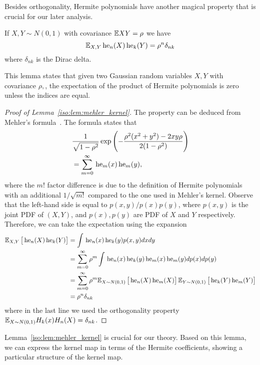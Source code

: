 
Besides orthogonality, Hermite polynomials have another magical property that is crucial for our later analysis. 

\begin{lemma}\label{iso:lem:mehler_kernel}
If $X,Y \sim N(0,1)$ with covariance $\mathbb{E} XY = \rho$ we have 
$$\mathbb{E}_{X,Y} \,\mathrm{he}_n(X)\,\mathrm{he}_k(Y) = \rho^n \delta_{nk}$$
where $\delta_{nk}$ is the Dirac delta.  
\end{lemma}

This lemma states that given two Gaussian random variables $X, Y$ with covariance $\rho,$, the expectation of the product of Hermite polynomials is zero unless the indices are equal. 

\begin{proof}[Proof of Lemma~\ref{iso:lem:mehler_kernel}]
The property can be deduced from Mehler's formula~\cite{mehler1866ueber}. The formula states that 
\begin{align*}
&\frac{1}{\sqrt{1-\rho^2}}\exp\left(-\frac{\rho^2(x^2+y^2)-2xy\rho}{2(1-\rho^2)}\right) \\
&= \sum_{m=0}^\infty \,\mathrm{he}_m(x)\,\mathrm{he}_m(y),
\end{align*}
where the $m!$ factor difference is due to the definition of Hermite polynomials with an additional $1/\sqrt{m!}$ compared to the one used in Mehler's kernel. 
Observe that the left-hand side is equal to $p(x,y)/p(x)p(y)$, where $p(x,y)$ is the joint PDF of $(X, Y)$, and $p(x),p(y)$ are PDF of $X$ and $Y$ respectively. Therefore, we can take the expectation using the expansion 
\begin{align*}
\mathbb{E}_{X,Y}\left[ \,\mathrm{he}_n(X) \,\mathrm{he}_k(Y)\right] &= \int \,\mathrm{he}_n(x)\,\mathrm{he}_k(y)p(x,y)dx dy \\
&=  \sum_{m=0}^\infty \rho^m\int \,\mathrm{he}_n(x)\,\mathrm{he}_k(y) \,\mathrm{he}_m(x)\,\mathrm{he}_m(y) dp(x)dp(y)\\
&= \sum_{m=0}^\infty \rho^m\mathbb{E}_{X\sim N(0,1)} \left[\,\mathrm{he}_n(X)\,\mathrm{he}_m(X)\right]\mathbb{E}_{Y\sim N(0,1)} \left[\,\mathrm{he}_k(Y)\,\mathrm{he}_m(Y)\right] \\
&= \rho^n \delta_{nk} 
\end{align*}
where in the last line we used the orthogonality property $\mathbb{E}_{X\sim N(0,1)} H_k(x) H_n(X)=\delta_{nk}$. 
\end{proof}

Lemma~\ref{iso:lem:mehler_kernel} is crucial for our theory. Based on this lemma, we can express the kernel map in terms of the Hermite coefficients, showing a particular structure of the kernel map.

